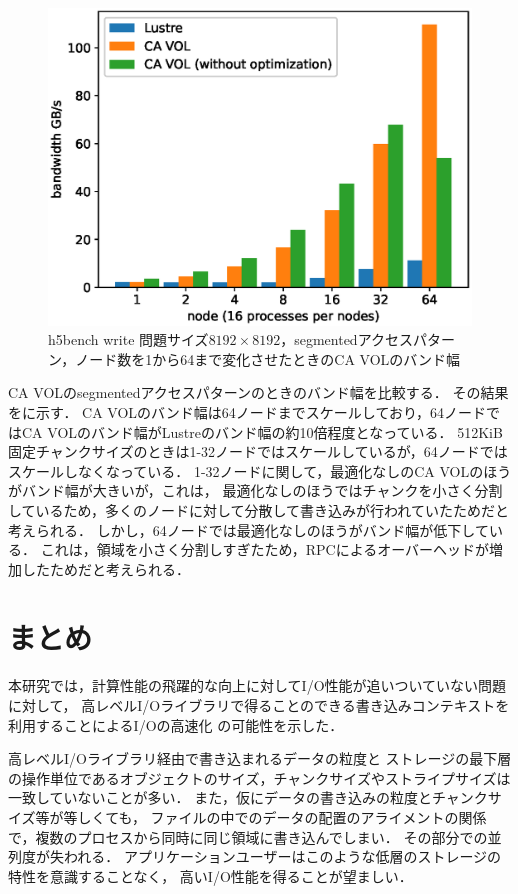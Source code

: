 \documentclass[submit,techrep,noauthor]{ipsj}
\begin{document}
\begin{figure}[t]
	\centering
	\includegraphics[width=\linewidth]{figure/segmented_chfs.eps}
	\caption{h5bench write 問題サイズ$8192 \times 8192$，segmentedアクセスパターン，ノード数を1から64まで変化させたときのCA VOLのバンド幅}
	\label{fig:h5writesegmented}
\end{figure}


CA VOLのsegmentedアクセスパターンのときのバンド幅を比較する．
その結果をに示す．
CA VOLのバンド幅は64ノードまでスケールしており，64ノードではCA VOLのバンド幅がLustreのバンド幅の約10倍程度となっている．
512KiB固定チャンクサイズのときは1-32ノードではスケールしているが，64ノードではスケールしなくなっている．
1-32ノードに関して，最適化なしのCA VOLのほうがバンド幅が大きいが，これは，
最適化なしのほうではチャンクを小さく分割しているため，多くのノードに対して分散して書き込みが行われていたためだと考えられる．
しかし，64ノードでは最適化なしのほうがバンド幅が低下している．
これは，領域を小さく分割しすぎたため，RPCによるオーバーヘッドが増加したためだと考えられる．

\section{まとめ}
本研究では，計算性能の飛躍的な向上に対してI/O性能が追いついていない問題に対して，
高レベルI/Oライブラリで得ることのできる書き込みコンテキストを利用することによるI/Oの高速化
の可能性を示した．

高レベルI/Oライブラリ経由で書き込まれるデータの粒度と
ストレージの最下層の操作単位であるオブジェクトのサイズ，チャンクサイズやストライプサイズは一致していないことが多い．
また，仮にデータの書き込みの粒度とチャンクサイズ等が等しくても，
ファイルの中でのデータの配置のアライメントの関係で，複数のプロセスから同時に同じ領域に書き込んでしまい．
その部分での並列度が失われる．
アプリケーションユーザーはこのような低層のストレージの特性を意識することなく，
高いI/O性能を得ることが望ましい．
\end{document}

